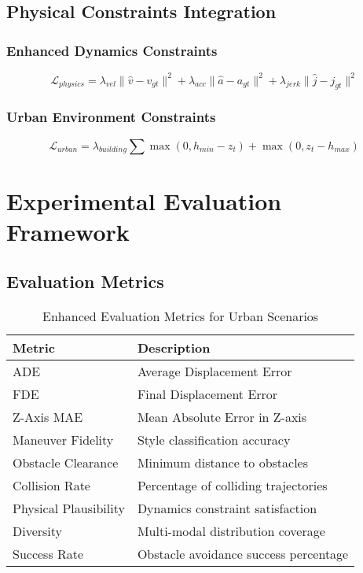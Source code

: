 \documentclass[12pt]{article}
\begin{document}
\subsection{Physical Constraints Integration}

\subsubsection{Enhanced Dynamics Constraints}

\begin{equation}
\mathcal{L}_{physics} = \lambda_{vel} \| \hat{v} - v_{gt} \|^2 + \lambda_{acc} \| \hat{a} - a_{gt} \|^2 + \lambda_{jerk} \| \hat{j} - j_{gt} \|^2
\end{equation}

\subsubsection{Urban Environment Constraints}

\begin{equation}
\mathcal{L}_{urban} = \lambda_{building} \sum \max(0, h_{min} - z_t) + \max(0, z_t - h_{max})
\end{equation}

\section{Experimental Evaluation Framework}

\subsection{Evaluation Metrics}

\begin{table}[h]
\centering
\caption{Enhanced Evaluation Metrics for Urban Scenarios}
\begin{tabular}{ll}
\toprule
\textbf{Metric} & \textbf{Description} \\
\midrule
ADE & Average Displacement Error \\
FDE & Final Displacement Error \\
Z-Axis MAE & Mean Absolute Error in Z-axis \\
Maneuver Fidelity & Style classification accuracy \\
Obstacle Clearance & Minimum distance to obstacles \\
Collision Rate & Percentage of colliding trajectories \\
Physical Plausibility & Dynamics constraint satisfaction \\
Diversity & Multi-modal distribution coverage \\
Success Rate & Obstacle avoidance success percentage \\
\bottomrule
\end{tabular}
\end{table}
\end{document}
